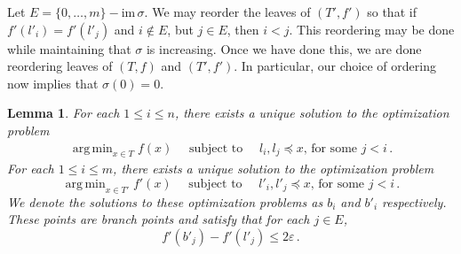\documentclass{article}
\DeclareMathOperator*{\argmin}{arg\,min}
\newtheorem{lemma}[theorem]{Lemma}
\theoremstyle{definition}
\newcommand{\im}{\mathrm{im}\,}
\renewcommand{\epsilon}{\varepsilon}
\begin{document}
Let $E = \{0,\ldots, m\} - \im\sigma$. We may reorder the leaves of $(T',f')$ so that if $f'(l'_i) = f'(l'_j)$ and $i \notin E$, but $j \in E$, then $i < j$. This reordering may be done while maintaining that $\sigma$ is increasing. Once we have done this, we are done reordering leaves of $(T,f)$ and $(T',f')$. In particular, our choice of ordering now implies that $\sigma(0) = 0$.

\begin{lemma}
    \label{lem:branchpoints}
    For each $1 \leq i \leq n$, there exists a unique solution to the optimization problem
    \begin{align*}
        \argmin_{x \in T}f(x) \quad \text{ subject to } \quad l_i, l_j \preceq x\text{, for some } j < i\,.
    \end{align*}
    For each $1 \leq i \leq m$, there exists a unique solution to the optimization problem
    \begin{equation*}
        \argmin_{x \in T'}f'(x) \quad \text{ subject to } \quad l'_i, l'_j \preceq x\text{, for some } j < i\,.
    \end{equation*}
    We denote the solutions to these optimization problems as $b_i$ and $b'_i$ respectively. These points are branch points and satisfy that for each $j \in E$,
    \begin{equation*}
        f'(b'_{j}) - f'(l'_j) \leq 2\epsilon\,.
    \end{equation*}
\end{lemma}
\end{document}
